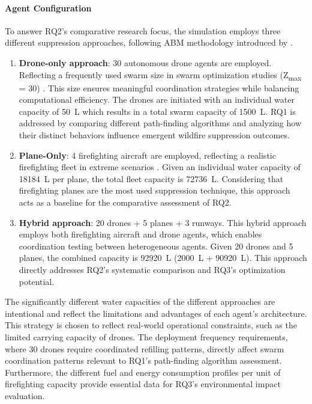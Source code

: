 \documentclass[11pt, a4paper]{article}
\begin{document}
\paragraph{Agent Configuration} To answer RQ2's comparative research focus, the simulation employs three different suppression approaches, following ABM methodology introduced by \citet*{wilensky2015introduction}.
\begin{enumerate}
  \item \textbf{Drone-only approach}: 30 autonomous drone agents are employed. Reflecting a frequently used swarm size in swarm optimization studies (Z\textsubscript{max} = 30) \citep{swarm1_kozlov2022information,swarm2_optimization_drone}. This size ensures meaningful coordination strategies while balancing computational efficiency. The drones are initiated with an individual water capacity of \SI{50}{\liter} which results in a total swarm capacity of \SI{1500}{\liter}. RQ1 is addressed by comparing different path-finding algorithms and analyzing how their distinct behaviors influence emergent wildfire suppression outcomes.
  \item \textbf{Plane-Only}: 4 firefighting aircraft are employed, reflecting a realistic firefighting fleet in extreme scenarios \citep{sherryAerialFireFighting2025}. Given an individual water capacity of \SI{18184}{\liter} per plane, the total fleet capacity is \SI{72736}{\liter}. Considering that firefighting planes are the most used suppression technique, this approach acts as a baseline for the comparative assessment of RQ2.
  \item \textbf{Hybrid approach}: 20 drones + 5 planes + 3 runways. This hybrid approach employs both firefighting aircraft and drone agents, which enables coordination testing between heterogeneous agents. Given 20 drones and 5 planes, the combined capacity is \SI{92920}{\liter} (\SI{2000}{\liter} + \SI{90920}{\liter}). This approach directly addresses RQ2's systematic comparison and RQ3's optimization potential. 
\end{enumerate}

The significantly different water capacities of the different approaches are intentional and reflect the limitations and advantages of each agent's architecture. This strategy is chosen to reflect real-world operational constraints, such as the limited carrying capacity of drones.
The deployment frequency requirements, where 30 drones require coordinated refilling patterns, directly affect swarm coordination patterns relevant to RQ1's path-finding algorithm assessment. Furthermore, the different fuel and energy consumption profiles per unit of firefighting capacity provide essential data for RQ3's environmental impact evaluation.
\end{document}
